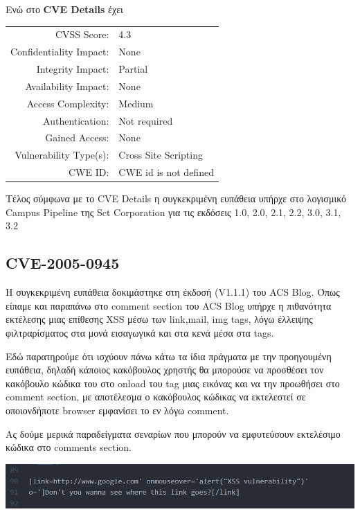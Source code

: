 \noindent
Ενώ στο \textbf{CVE Details} έχει 


\begin{tabular}{rl}
\hline
CVSS Score: & 	4.3\\
Confidentiality Impact: & \noindent None \\
Integrity Impact: & Partial \\
Availability Impact:  &	None \\
Access Complexity: &	Medium \\
Authentication: 	& Not required \\
Gained Access: 	& None\\
Vulnerability Type(s): & 	Cross Site Scripting	\\
CWE ID: &	CWE id is not defined \\
\hline
\end{tabular}


\noindent
Τέλος σύμφωνα με το CVE Details η συγκεκριμένη ευπάθεια υπήρχε στο λογισμικό Campus Pipeline της Sct Corporation για τις εκδόσεις 1.0, 2.0, 2.1, 2.2, 3.0, 3.1, 3.2

\subsection{CVE-2005-0945}
\noindent 
Η συγκεκριμένη ευπάθεια δοκιμάστηκε στη έκδοσή (V1.1.1) του ACS Blog. Όπως είπαμε και παραπάνω στο comment section του ACS Blog υπήρχε η πιθανότητα εκτέλεσης μιας επίθεσης XSS μέσω των link,mail, img tags, λόγω έλλειψης φιλτραρίσματος στα μονά εισαγωγικά και στα κενά μέσα στα tags. 

\noindent
Εδώ παρατηρούμε ότι ισχύουν πάνω κάτω τα ίδια πράγματα με την προηγουμένη ευπάθεια, δηλαδή κάποιος κακόβουλος χρηστής θα μπορούσε να προσθέσει τον κακόβουλο κώδικα του στο onload του tag μιας εικόνας και να την προωθήσει στο comment section, με αποτέλεσμα ο κακόβουλος κώδικας να εκτελεστεί σε οποιονδήποτε browser εμφανίσει το εν λόγω comment.

\noindent
Ας δούμε μερικά παραδείγματα σεναρίων που μπορούν να εμφυτεύσουν εκτελέσιμο κώδικα στο comments section.

\begin{center}
			\includegraphics[width=1\textwidth]{image/27.PNG}		
\end{center}

